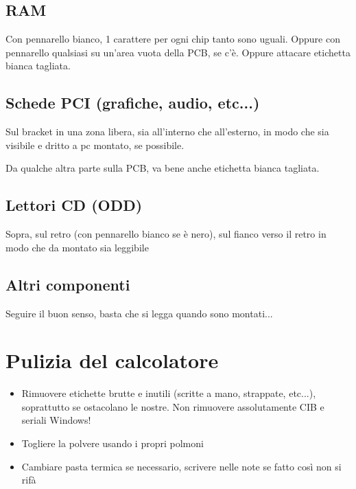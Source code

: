 \documentclass[a4paper,11pt,twoside]{article}
\begin{document}
\subsection{RAM}
Con pennarello bianco, 1 carattere per ogni chip tanto sono uguali. Oppure con pennarello qualsiasi su un'area vuota della PCB, se c'\`e. Oppure attacare etichetta bianca tagliata.

\subsection{Schede PCI (grafiche, audio, etc...)}

Sul bracket in una zona libera, sia all'interno che all'esterno, in modo che sia visibile e dritto a pc montato, se possibile.

Da qualche altra parte sulla PCB, va bene anche etichetta bianca tagliata.

\subsection{Lettori CD (ODD)}

Sopra, sul retro (con pennarello bianco se \`e nero), sul fianco verso il retro in modo che da montato sia leggibile

\subsection{Altri componenti}

Seguire il buon senso, basta che si legga quando sono montati...

\section{Pulizia del calcolatore}

\begin{itemize}
	\item Rimuovere etichette brutte e inutili (scritte a mano, strappate, etc...), soprattutto se ostacolano le nostre. Non rimuovere assolutamente CIB e seriali Windows!
	\item Togliere la polvere usando i propri polmoni
	\item Cambiare pasta termica se necessario, scrivere nelle note se fatto cos\`i non si rif\`a
\end{itemize}
\end{document}

